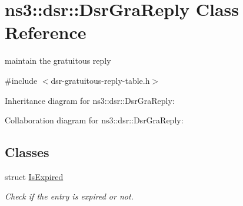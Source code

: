 \hypertarget{classns3_1_1dsr_1_1DsrGraReply}{}\section{ns3\+:\+:dsr\+:\+:Dsr\+Gra\+Reply Class Reference}
\label{classns3_1_1dsr_1_1DsrGraReply}


maintain the gratuitous reply  




{\ttfamily \#include $<$dsr-\/gratuitous-\/reply-\/table.\+h$>$}



Inheritance diagram for ns3\+:\+:dsr\+:\+:Dsr\+Gra\+Reply\+:


Collaboration diagram for ns3\+:\+:dsr\+:\+:Dsr\+Gra\+Reply\+:
\subsection*{Classes}
\begin{DoxyCompactItemize}
\item 
struct \hyperlink{structns3_1_1dsr_1_1DsrGraReply_1_1IsExpired}{Is\+Expired}
\begin{DoxyCompactList}\small\item\em Check if the entry is expired or not. \end{DoxyCompactList}\end{DoxyCompactItemize}
